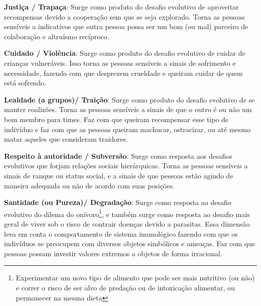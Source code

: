 \begin{description}
\item \textbf{Justiça / Trapaça}: Surge como produto do desafio evolutivo de
aproveitar recompensas devido a cooperação sem que se seja explorado. Torna as
pessoas sensíveis a indicativos que outra pessoa possa ser um bom (ou mal)
parceiro de colaboração e altruísmo recíproco.

\item \textbf{Cuidado / Violência}: Surge como produto do desafio evolutivo 
de cuidar de crianças vulneráveis. Isso torna as pessoas sensíveis a sinais 
de sofrimento e necessidade, fazendo com que desprezem crueldade e queiram 
cuidar de quem está sofrendo. 

\item \textbf{Lealdade (a grupos)/ Traição}: Surge como produto do desafio
evolutivo de se manter coalizões. Torna as pessoas sensíveis a sinais de que o
outro é ou não um bom membro para times. Faz com que queiram recompensar esse
tipo de indivíduo e faz com que as pessoas queiram machucar, ostracizar, ou
até mesmo matar aqueles que consideram traidores.

\item \textbf{Respeito à autoridade / Subversão}: Surge como resposta aos
desafios evolutivos que forjam relações sociais hierárquicas. Torna as pessoas
sensíveis a sinais de ranque ou status social, e a sinais de que pessoas estão
agindo de maneira adequada ou não de acordo com suas posições.

\item \textbf{Santidade (ou Pureza)/ Degradação}: Surge como resposta ao desafio
evolutivo do dilema do onívoro\footnote{ Experimentar um novo tipo de
alimento que pode ser mais nutritivo (ou não) e correr o risco de ser alvo
de predação ou de intoxicação alimentar, ou permanecer na mesma dieta},
e também surge como resposta ao desafio mais geral de viver sob o risco
de contrair doenças devido a parasitas. Essa dimensão leva em conta o
comportamento de sistema imunológico fazendo com que os indivíduos se
preocupem com diversos objetos simbólicos e ameaças. Faz com que pessoas
possam investir valores extremos a objetos de forma irracional.
\end{description}


